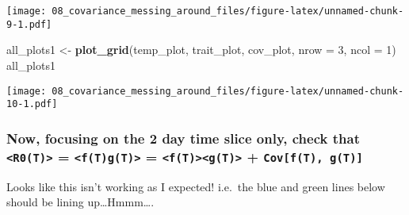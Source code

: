 \documentclass[]{article}
\newenvironment{Shaded}{\begin{snugshade}}{\end{snugshade}}
\newcommand{\KeywordTok}[1]{\textcolor[rgb]{0.13,0.29,0.53}{\textbf{{#1}}}}
\newcommand{\DataTypeTok}[1]{\textcolor[rgb]{0.13,0.29,0.53}{{#1}}}
\newcommand{\DecValTok}[1]{\textcolor[rgb]{0.00,0.00,0.81}{{#1}}}
\newcommand{\StringTok}[1]{\textcolor[rgb]{0.31,0.60,0.02}{{#1}}}
\newcommand{\NormalTok}[1]{{#1}}
\begin{document}
\texttt{[image: 08\_covariance\_messing\_around\_files/figure-latex/unnamed-chunk-9-1.pdf]}

\begin{Shaded}
\begin{Highlighting}[]
\NormalTok{all_plots1 <-}\StringTok{ }\KeywordTok{plot_grid}\NormalTok{(temp_plot, trait_plot, cov_plot, }\DataTypeTok{nrow =} \DecValTok{3}\NormalTok{, }\DataTypeTok{ncol =} \DecValTok{1}\NormalTok{)}
\NormalTok{all_plots1}
\end{Highlighting}
\end{Shaded}

\texttt{[image: 08\_covariance\_messing\_around\_files/figure-latex/unnamed-chunk-10-1.pdf]}

\subsubsection{\texorpdfstring{Now, focusing on the 2 day time slice
only, check that \texttt{\textless{}R0(T)\textgreater{}} =
\texttt{\textless{}f(T)g(T)\textgreater{}} =
\texttt{\textless{}f(T)\textgreater{}\textless{}g(T)\textgreater{}} +
\texttt{Cov{[}f(T),\ g(T){]}}}{Now, focusing on the 2 day time slice only, check that \textless{}R0(T)\textgreater{} = \textless{}f(T)g(T)\textgreater{} = \textless{}f(T)\textgreater{}\textless{}g(T)\textgreater{} + Cov{[}f(T), g(T){]}}}\label{now-focusing-on-the-2-day-time-slice-only-check-that-r0t-ftgt-ftgt-covft-gt}

Looks like this isn't working as I expected! i.e.~the blue and green
lines below should be lining up\ldots{}Hmmm\ldots{}.
\end{document}
